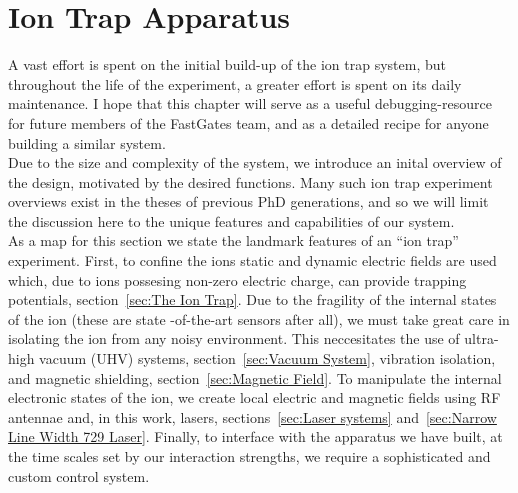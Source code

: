 \chapter{Ion Trap Apparatus}
\minitoc

    A vast effort is spent on the initial build-up of the ion trap system, but
    throughout the life of the experiment, a greater effort is spent on its daily
    maintenance.  I hope that this chapter will serve as a useful debugging-resource for future
    members of the FastGates team, and as a detailed recipe for anyone
    building a similar system. \\

    Due to the size and complexity of the system, we introduce an inital overview of
    the design, motivated by the desired functions.  
    Many such  ion trap experiment overviews exist in the theses of previous PhD generations, and so we will limit the discussion here to the unique features and capabilities of our system.\\
    
    As a map for this section we state the landmark features of an ``ion trap''
    experiment. First, to confine the ions static and dynamic electric fields
    are used which, due to ions possesing non-zero electric charge, can provide
    trapping potentials, section~\ref{sec:The Ion Trap}. Due to the fragility of
    the internal states of the ion (these are state -of-the-art sensors after
    all), we must take great care in isolating the ion from any noisy
    environment. This neccesitates the use of ultra-high vacuum (UHV) systems,
    section~\ref{sec:Vacuum System}, vibration isolation, and magnetic
    shielding, section~\ref{sec:Magnetic Field}. To manipulate the internal
    electronic states of the ion, we create local electric and magnetic fields
    using RF antennae and, in this work, lasers, sections~\ref{sec:Laser
    systems} and~\ref{sec:Narrow Line Width 729 Laser}.  Finally, to interface
    with the apparatus we have built, at the time scales set by our interaction
    strengths, we require a sophisticated and custom control system.



